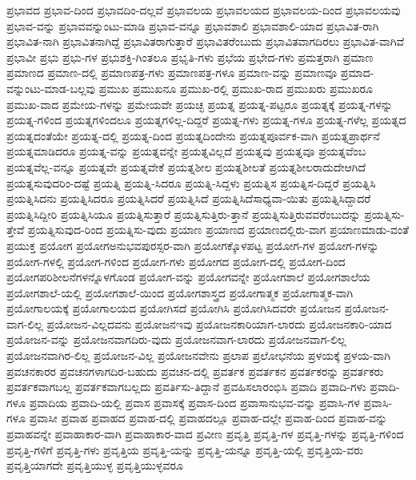 {ಪ್ರಭಾವದ
ಪ್ರಭಾವ-ದಿಂದ
ಪ್ರಭಾವದಿಂ-ದಲ್ಲವೆ
ಪ್ರಭಾವಲಯ
ಪ್ರಭಾವಲಯದ
ಪ್ರಭಾವಲಯ-ದಿಂದ
ಪ್ರಭಾವಲಯವು
ಪ್ರಭಾವ-ವನ್ನು
ಪ್ರಭಾವವನ್ನುಂಟು-ಮಾಡಿ
ಪ್ರಭಾವ-ವನ್ನೂ
ಪ್ರಭಾವಶಾಲಿ
ಪ್ರಭಾವಶಾಲಿ-ಯಾದ
ಪ್ರಭಾವಿತ-ರಾಗಿ
ಪ್ರಭಾವಿತ-ನಾಗಿ
ಪ್ರಭಾವಿತನಾಗಿದ್ದೆ
ಪ್ರಭಾವಿತರಾಗುತ್ತಾರೆ
ಪ್ರಭಾವಿತರೆಂಬುದು
ಪ್ರಭಾವಿತವಾಗದಿರಲು
ಪ್ರಭಾವಿತ-ವಾಗಿವೆ
ಪ್ರಭಾವೀ
ಪ್ರಭು
ಪ್ರಭು-ಗಳ
ಪ್ರಭುಶಕ್ತಿ-ಗಿಂತಲೂ
ಪ್ರಭೃತಿ-ಗಳು
ಪ್ರಭೆಯ
ಪ್ರಭೇದ-ಗಳು
ಪ್ರಮತ್ತರಾಗಿ
ಪ್ರಮಾಣ
ಪ್ರಮಾಣದ
ಪ್ರಮಾಣ-ದಲ್ಲಿ
ಪ್ರಮಾಣಪತ್ರ-ಗಳು
ಪ್ರಮಾಣಪತ್ರ-ಗಳೂ
ಪ್ರಮಾಣ-ವನ್ನು
ಪ್ರಮಾಣವೂ
ಪ್ರಮಾದ-ವನ್ನುಂಟು-ಮಾಡ-ಬಲ್ಲವು
ಪ್ರಮುಖ
ಪ್ರಮುಖನೂ
ಪ್ರಮುಖ-ರಲ್ಲಿ
ಪ್ರಮುಖ-ರಾದ
ಪ್ರಮುಖರು
ಪ್ರಮುಖರೂ
ಪ್ರಮುಖ-ವಾದ
ಪ್ರಮೇಯ-ಗಳನ್ನು
ಪ್ರಮೇಯವೇ
ಪ್ರಯಚ್ಛ
ಪ್ರಯತ್ನ
ಪ್ರಯತ್ನ-ಪಟ್ಟರೂ
ಪ್ರಯತ್ನಕ್ಕೆ
ಪ್ರಯತ್ನ-ಗಳನ್ನು
ಪ್ರಯತ್ನ-ಗಳಿಂದ
ಪ್ರಯತ್ನಗಳಿಂದಲೂ
ಪ್ರಯತ್ನಗಳಿಲ್ಲ-ದಿದ್ದರೆ
ಪ್ರಯತ್ನ-ಗಳು
ಪ್ರಯತ್ನ-ಗಳೂ
ಪ್ರಯತ್ನ-ಗಳೆಲ್ಲ
ಪ್ರಯತ್ನದ
ಪ್ರಯತ್ನದಂತೆಯೇ
ಪ್ರಯತ್ನ-ದಲ್ಲಿ
ಪ್ರಯತ್ನ-ದಿಂದ
ಪ್ರಯತ್ನದಿಂದೇನು
ಪ್ರಯತ್ನಪೂರ್ವಕ-ವಾಗಿ
ಪ್ರಯತ್ನಪ್ರಾರ್ಥನೆ
ಪ್ರಯತ್ನಮಾಡಿದರೂ
ಪ್ರಯತ್ನ-ವನ್ನು
ಪ್ರಯತ್ನವನ್ನೇ
ಪ್ರಯತ್ನವಿಲ್ಲದೆ
ಪ್ರಯತ್ನವು
ಪ್ರಯತ್ನವೂ
ಪ್ರಯತ್ನವೆಂಬ
ಪ್ರಯತ್ನವೆಲ್ಲ-ವನ್ನೂ
ಪ್ರಯತ್ನವೇ
ಪ್ರಯತ್ನವೇಕೆ
ಪ್ರಯತ್ನಶೀಲ
ಪ್ರಯತ್ನಶೀಲತೆ
ಪ್ರಯತ್ನಶೀಲರಾದುದೇಆಗಿದೆ
ಪ್ರಯತ್ನಸುವುದರಿಂ-ದಷ್ಟೆ
ಪ್ರಯತ್ನಿ
ಪ್ರಯತ್ನಿ-ಸಿದರೂ
ಪ್ರಯತ್ನಿ-ಸಿದ್ದಳು
ಪ್ರಯತ್ನಿಸ
ಪ್ರಯತ್ನಿಸ-ದಿದ್ದರೆ
ಪ್ರಯತ್ನಿಸಿ
ಪ್ರಯತ್ನಿಸಿದನು
ಪ್ರಯತ್ನಿಸಿದರೂ
ಪ್ರಯತ್ನಿಸಿದರೆ
ಪ್ರಯತ್ನಿಸಿದೆ
ಪ್ರಯತ್ನಿಸಿದೆಸಾಧ್ಯವಾ-ಯಿತು
ಪ್ರಯತ್ನಿಸಿದ್ದಾದರೆ
ಪ್ರಯತ್ನಿಸಿದ್ದೀರಿ
ಪ್ರಯತ್ನಿಸಿಯೂ
ಪ್ರಯತ್ನಿಸುತ್ತಾರೆ
ಪ್ರಯತ್ನಿಸುತ್ತಿರು-ತ್ತಾನೆ
ಪ್ರಯತ್ನಿಸುತ್ತಿರುವವರೆಂಬುದನ್ನು
ಪ್ರಯತ್ನಿಸು-ತ್ತೇವೆ
ಪ್ರಯತ್ನಿಸುವುದ-ರಿಂದ
ಪ್ರಯತ್ನಿಸು-ವುದು
ಪ್ರಯಾಣ
ಪ್ರಯಾಣದ
ಪ್ರಯಾಣದಲ್ಲಿರು-ವಾಗ
ಪ್ರಯಾಣಮಾಡು-ವಂತೆ
ಪ್ರಯುಕ್ತ
ಪ್ರಯೋಗ
ಪ್ರಯೋಗಅನುಭವಪುರಸ್ಸರ-ವಾಗಿ
ಪ್ರಯೋಗಕ್ಕೊಳಪಟ್ಟ
ಪ್ರಯೋಗ-ಗಳ
ಪ್ರಯೋಗ-ಗಳನ್ನು
ಪ್ರಯೋಗ-ಗಳಲ್ಲಿ
ಪ್ರಯೋಗ-ಗಳಿಂದ
ಪ್ರಯೋಗ-ಗಳು
ಪ್ರಯೋಗದ
ಪ್ರಯೋಗ-ದಲ್ಲಿ
ಪ್ರಯೋಗ-ದಿಂದ
ಪ್ರಯೋಗಪರಿಶೀಲನೆಗಳನ್ನೊಳಗೊಂಡ
ಪ್ರಯೋಗ-ವನ್ನು
ಪ್ರಯೋಗವನ್ನೇ
ಪ್ರಯೋಗಶಾಲೆ
ಪ್ರಯೋಗಶಾಲೆಯ
ಪ್ರಯೋಗಶಾಲೆ-ಯಲ್ಲಿ
ಪ್ರಯೋಗಶಾಲೆ-ಯಿಂದ
ಪ್ರಯೋಗಶಾಸ್ತ್ರದ
ಪ್ರಯೋಗಾತ್ಮಕ
ಪ್ರಯೋಗಾತ್ಮಕ-ವಾಗಿ
ಪ್ರಯೋಗಾಲಯಕ್ಕೆ
ಪ್ರಯೋಗಾಲಯದ
ಪ್ರಯೋಗಿಸದೆ
ಪ್ರಯೋಗಿಸಿ
ಪ್ರಯೋಗಿಸಿದವರೇ
ಪ್ರಯೋಜನ
ಪ್ರಯೋಜನ-ವಾಗ-ಲಿಲ್ಲ
ಪ್ರಯೋಜನ-ವಿಲ್ಲದವನು
ಪ್ರಯೋಜನಇವು
ಪ್ರಯೋಜನಕಾರಿಯಾಗ-ಲಾರದು
ಪ್ರಯೋಜನಕಾರಿ-ಯಾದ
ಪ್ರಯೋಜನ-ವನ್ನು
ಪ್ರಯೋಜನವಾಗದಿರು-ವುದು
ಪ್ರಯೋಜನವಾಗ-ಲಾರದು
ಪ್ರಯೋಜನವಾಗ-ಲಿಲ್ಲ
ಪ್ರಯೋಜನವಾಗಿರ-ಲಿಲ್ಲ
ಪ್ರಯೋಜನ-ವಿಲ್ಲ
ಪ್ರಯೋಜನವೇನು
ಪ್ರಲಾಪ
ಪ್ರಲೋಭನೆಯ
ಪ್ರಳಯಕ್ಕೆ
ಪ್ರಳಯ-ವಾಗಿ
ಪ್ರವಚನಕಾರರ
ಪ್ರವಚನಗಳಾಗದಿರ-ಬಹುದು
ಪ್ರವಚನ-ದಲ್ಲಿ
ಪ್ರವರ್ತಕ
ಪ್ರವರ್ತಕನ
ಪ್ರವರ್ತಕರನ್ನು
ಪ್ರವರ್ತಕರು
ಪ್ರವರ್ತಕವಾಗಬಲ್ಲ
ಪ್ರವರ್ತಕವಾಗಬಲ್ಲದು
ಪ್ರವರ್ತಿಸು-ತಿದ್ದಾನೆ
ಪ್ರವಹಿಸಲಾರಂಭಿಸಿ
ಪ್ರವಾದಿ
ಪ್ರವಾದಿ-ಗಳು
ಪ್ರವಾದಿ-ಗಳೂ
ಪ್ರವಾದಿಯ
ಪ್ರವಾದಿ-ಯಲ್ಲಿ
ಪ್ರವಾಸ
ಪ್ರವಾಸಕ್ಕೆ
ಪ್ರವಾಸ-ದಿಂದ
ಪ್ರವಾಸಾನುಭವ-ವನ್ನು
ಪ್ರವಾಸಿ-ಗಳ
ಪ್ರವಾಸಿ-ಗಳೂ
ಪ್ರವಾಸೀ
ಪ್ರವಾಹ
ಪ್ರವಾಹದ
ಪ್ರವಾಹ-ದಲ್ಲಿ
ಪ್ರವಾಹದಲ್ಲೂ
ಪ್ರವಾಹ-ದಲ್ಲೇ
ಪ್ರವಾಹ-ದಿಂದ
ಪ್ರವಾಹ-ವನ್ನು
ಪ್ರವಾಹವನ್ನೇ
ಪ್ರವಾಹಾಕಾರ-ವಾಗಿ
ಪ್ರವಾಹಾಕಾರ-ವಾದ
ಪ್ರವೀಣ
ಪ್ರವೃತ್ತಿ
ಪ್ರವೃತ್ತಿ-ಗಳ
ಪ್ರವೃತ್ತಿ-ಗಳನ್ನು
ಪ್ರವೃತ್ತಿ-ಗಳಿಂದ
ಪ್ರವೃತ್ತಿ-ಗಳಿಗೆ
ಪ್ರವೃತ್ತಿ-ಗಳು
ಪ್ರವೃತ್ತಿಯ
ಪ್ರವೃತ್ತಿ-ಯನ್ನು
ಪ್ರವೃತ್ತಿ-ಯನ್ನೂ
ಪ್ರವೃತ್ತಿ-ಯಲ್ಲಿ
ಪ್ರವೃತ್ತಿಯ-ವರು
ಪ್ರವೃತ್ತಿಯಾಗದೇ
ಪ್ರವೃತ್ತಿಯುಳ್ಳ
ಪ್ರವೃತ್ತಿಯುಳ್ಳವರೂ
}
